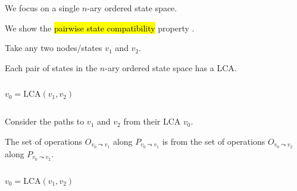
\begin{frame}{}
  \centerline{}
\end{frame}

\begin{frame}{}
  \begin{center}
    {\large We focus on a single $n$-ary ordered state space.}
  \end{center}


  \begin{center}
    {\large We show the \hl{pairwise state compatibility} property .} \\[5pt] 
  \end{center}
\end{frame}

\begin{frame}{}
  \centerline{ Take any two nodes/states $v_1$ and $v_2$.}

  \begin{lemma}
    Each pair of states in the $n$-ary ordered state space has a  LCA.
  \end{lemma}

  \begin{columns}
	\[
	  v_0 = \text{LCA}(v_1, v_2)
	\]
  \end{columns}
\end{frame}

\begin{frame}{}
  \centerline{ Consider the paths to $v_1$ and $v_2$ from their LCA $v_0$.}

  \begin{lemma}
    The set of operations $O_{v_0 \leadsto v_1}$ along $P_{v_0 \leadsto v_1}$ 
    is  from the set of operations $O_{v_0 \leadsto v_2}$ along $P_{v_0 \leadsto v_2}$.
  \end{lemma}

  \begin{columns}
	\[
	  v_0 = \text{LCA}(v_1, v_2)
	\]
  \end{columns}
\end{frame}

